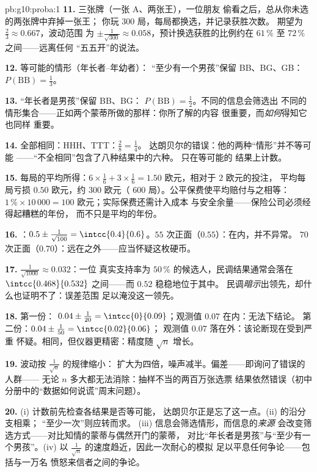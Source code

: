 \begin{solution}{pb:g10:proba:1}
\textbf{11.} 三张牌（一张 A、两张王），一位朋友
偷看之后，总从你未选的两张牌中弃掉一张王；
你玩 $300$ 局，每局都换选，并记录获胜次数。
期望为 $\frac23 \approx 0.667$，波动范围
为 $\pm\frac{1}{\sqrt{300}} \approx 0.058$，预计换选获胜的比例约在
$61\,\%$ 至 $72\,\%$ 之间——远离任何
“五五开”的说法。

\textbf{12.} 等可能的情形（年长者--年幼者）：
“至少有一个男孩”保留 BB、BG、GB：
$P(\text{BB}) = \frac13$。

\textbf{13.} “年长者是男孩”保留 BB、BG：
$P(\text{BB}) = \frac12$。不同的信息会筛选出
不同的情形集合——正如两个蒙蒂所做的那样：你所了解的内容
很重要，而\emph{如何}得知它也同样
重要。

\textbf{14.} 全部相同：HHH、TTT：$\frac28 = \frac14$。
达朗贝尔的错误：他的两种“情形”并不等可能
——“不全相同”包含了八种结果中的六种。
 只在等可能的
结果上计数。

\textbf{15.} 每局的平均所得：$6 \times \frac16 + 3
\times \frac16 = 1.50$ 欧元，相对于 $2$ 欧元的投注，
平均每局亏损 $0.50$ 欧元，约 $300$ 欧元（
$600$ 局）。公平保费使平均赔付与之相等：
$1\,\% \times 10\,000 = 100$ 欧元；实际保费还需计入成本
与安全余量——保险公司必须经得起糟糕的年份，
而不只是平均的年份。

\textbf{16.} ：$0.5 \pm \frac{1}{\sqrt{100}} =
\intcc{0.4}{0.6}$。$55$ 次正面（$0.55$）：在内，并不异常。
$70$ 次正面（$0.70$）：远在之外——应当怀疑这枚硬币。

\textbf{17.} $\frac{1}{\sqrt{1000}} \approx 0.032$：一位
真实支持率为 $50\,\%$ 的候选人，民调结果通常会落在
$\intcc{0.468}{0.532}$ 之间——而 $0.52$ 稳稳地位于其中。
民调\emph{暗示}出领先，却什么也证明不了：误差范围
足以淹没这一领先。

\textbf{18.} 第一份： $0.04 \pm \frac{1}{20} =
\intcc{0}{0.09}$；观测值 $0.07$ 在内：无法下结论。
第二份：$0.04 \pm \frac{1}{50} = \intcc{0.02}{0.06}$；
观测值 $0.07$ 落在外：该论断现在受到严重
怀疑。相同，但仪器更精密：精度随
$\sqrt n$ 增长。

\textbf{19.} 波动按 $\frac{1}{\sqrt n}$ 的规律缩小：
扩大为四倍，噪声减半。偏差——即询问了错误的人群——
无论 $n$ 多大都无法消除：抽样不当的两百万张选票
结果依然错误（初中分册中的“数据如何说谎”周末问题）。

\textbf{20.} (i) 计数前先检查各结果是否等可能，
达朗贝尔正是忘了这一点。(ii) 的沿分支相乘；
“至少一次”则应转而求。
(iii) 信息会筛选情形，而信息的\emph{来源}
会改变筛选方式——对比知情的蒙蒂与偶然开门的蒙蒂，
对比“年长者是男孩”与“至少有一个男孩”。(iv) 以
$\frac{1}{\sqrt n}$ 的速度趋近，因此一次耐心的模拟
足以平息任何争论——包括与一万名
愤怒来信者之间的争论。
\end{solution}
